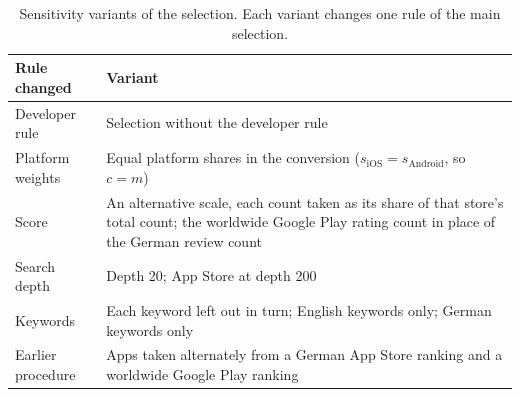 \begin{table}[H]
\centering
\begin{singlespace}
\caption{Sensitivity variants of the selection. Each variant changes one rule of the main
selection.}
\label{tab:sensitivity-variants}
\small
\begin{tabularx}{\textwidth}{@{}l>{\raggedright\arraybackslash}X@{}}
\toprule
\textbf{Rule changed} & \textbf{Variant} \\
\midrule
Developer rule & Selection without the developer rule \\
Platform weights & Equal platform shares in the conversion ($s_{\mathrm{iOS}}=s_{\mathrm{Android}}$, so $c=m$) \\
Score & An alternative scale, each count taken as its share of that store's total count; the worldwide Google Play rating count in place of the German review count \\
Search depth & Depth 20; App Store at depth 200 \\
Keywords & Each keyword left out in turn; English keywords only; German keywords only \\
Earlier procedure & Apps taken alternately from a German App Store ranking and a worldwide Google Play ranking \\
\bottomrule
\end{tabularx}
\end{singlespace}
\end{table}
